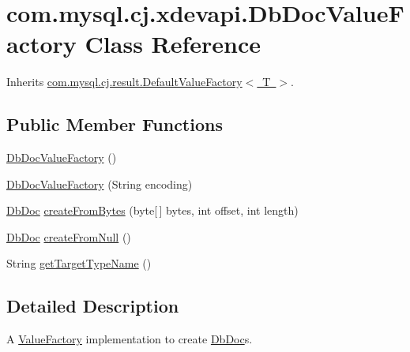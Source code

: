 \hypertarget{classcom_1_1mysql_1_1cj_1_1xdevapi_1_1_db_doc_value_factory}{}\section{com.\+mysql.\+cj.\+xdevapi.\+Db\+Doc\+Value\+Factory Class Reference}
\label{classcom_1_1mysql_1_1cj_1_1xdevapi_1_1_db_doc_value_factory}


Inherits \mbox{\hyperlink{classcom_1_1mysql_1_1cj_1_1result_1_1_default_value_factory}{com.\+mysql.\+cj.\+result.\+Default\+Value\+Factory$<$ T $>$}}.

\subsection*{Public Member Functions}
\begin{DoxyCompactItemize}
\item 
\mbox{\hyperlink{classcom_1_1mysql_1_1cj_1_1xdevapi_1_1_db_doc_value_factory_ab0dd333d9dbaf8f84dbf22e003d8d303}{Db\+Doc\+Value\+Factory}} ()
\item 
\mbox{\hyperlink{classcom_1_1mysql_1_1cj_1_1xdevapi_1_1_db_doc_value_factory_a7d4fdd157d809bf35ba333c8b4200713}{Db\+Doc\+Value\+Factory}} (String encoding)
\item 
\mbox{\hyperlink{interfacecom_1_1mysql_1_1cj_1_1xdevapi_1_1_db_doc}{Db\+Doc}} \mbox{\hyperlink{classcom_1_1mysql_1_1cj_1_1xdevapi_1_1_db_doc_value_factory_a9c915537c139a6430520b8a0b92d461e}{create\+From\+Bytes}} (byte\mbox{[}$\,$\mbox{]} bytes, int offset, int length)
\item 
\mbox{\hyperlink{interfacecom_1_1mysql_1_1cj_1_1xdevapi_1_1_db_doc}{Db\+Doc}} \mbox{\hyperlink{classcom_1_1mysql_1_1cj_1_1xdevapi_1_1_db_doc_value_factory_aac55d0e29aad7c0176b3c9d6a95b55f6}{create\+From\+Null}} ()
\item 
String \mbox{\hyperlink{classcom_1_1mysql_1_1cj_1_1xdevapi_1_1_db_doc_value_factory_af2ac0c4c05e6606e87b045f8eaed3f1e}{get\+Target\+Type\+Name}} ()
\end{DoxyCompactItemize}


\subsection{Detailed Description}
A \mbox{\hyperlink{}{Value\+Factory}} implementation to create \mbox{\hyperlink{interfacecom_1_1mysql_1_1cj_1_1xdevapi_1_1_db_doc}{Db\+Doc}}s. 

